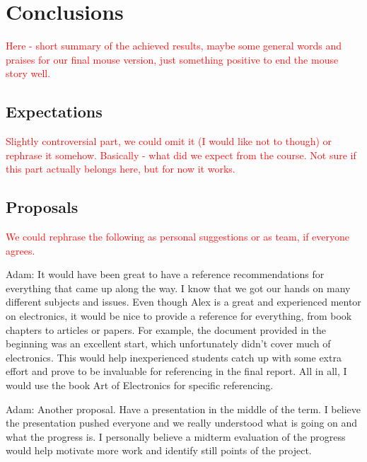 \section{Conclusions}
\textcolor{red}{
Here - short summary of the achieved results, maybe some general words and praises for our final mouse version, just something positive to end the mouse story well.
}

\subsection{Expectations}
\textcolor{red}{
Slightly controversial part, we could omit it (I would like not to though) or rephrase it somehow. Basically - what did we expect from the course. Not sure if this part actually belongs here, but for now it works.
}
\subsection{Proposals}

\textcolor{red}{We could rephrase the following as personal suggestions or as team, if everyone agrees.}

Adam: It would have been great to have a reference recommendations for everything that came up along the way. I know that we got our hands on many different subjects and issues. Even though Alex is a great and experienced mentor on electronics, it would be nice to provide a reference for everything, from book chapters to articles or papers. For example, the document provided in the beginning was an excellent start, which unfortunately didn't cover much of electronics. This would help inexperienced students catch up with some extra effort and prove to be invaluable for referencing in the final report. All in all, I would use the book Art of Electronics for specific referencing.

Adam: Another proposal. Have a presentation in the middle of the term. I believe the presentation pushed everyone and we really understood what is going on and what the progress is. I personally believe a midterm evaluation of the progress would help motivate more work and identify still points of the project.
